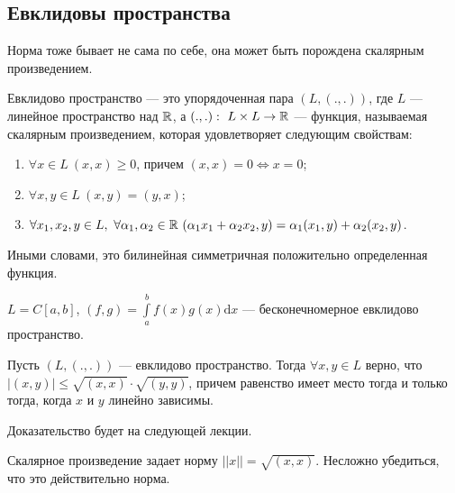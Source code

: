 \subsection{Евклидовы пространства}
Норма тоже бывает не сама по себе, она может быть порождена скалярным произведением.
\begin{Def}
Евклидово пространство --- это упорядоченная пара $(L, (., .))$, где $L$ --- линейное пространство над $\mathbb{R}$, а $(., .):\ L\times L \to \mathbb{R}$ --- функция, называемая скалярным произведением, которая удовлетворяет следующим свойствам:
\begin{enumerate}
\item $\forall x \in L\ (x, x) \geq 0$, причем $(x, x) = 0 \Leftrightarrow x = 0$;
\item $\forall x, y\in L\ (x, y) = (y, x)$;
\item $\forall x_1, x_2, y \in L,\ \forall \alpha_1, \alpha_2 \in \mathbb{R}\ (\alpha_1x_1 + \alpha_2x_2, y) = \alpha_1(x_1, y) + \alpha_2(x_2, y)$.
\end{enumerate}
Иными словами, это билинейная симметричная положительно определенная функция.
\end{Def}

\begin{Examples}
$L = C[a, b]$, $(f, g) = \int\limits_a^bf(x)g(x)\mathrm{d}x$ --- бесконечномерное евклидово пространство.
\end{Examples}

\begin{Theorem}
Пусть $(L, (., .))$ --- евклидово пространство. Тогда $\forall x, y \in L$ верно, что $|(x, y)| \leq \sqrt{(x, x)}\cdot\sqrt{(y, y)}$, причем равенство имеет место тогда и только тогда, когда $x$ и $y$ линейно зависимы.
\end{Theorem}
Доказательство будет на следующей лекции.

\begin{Statement}
Скалярное произведение задает норму $||x|| = \sqrt{(x, x)}$. Несложно убедиться, что это действительно норма.
\end{Statement}
